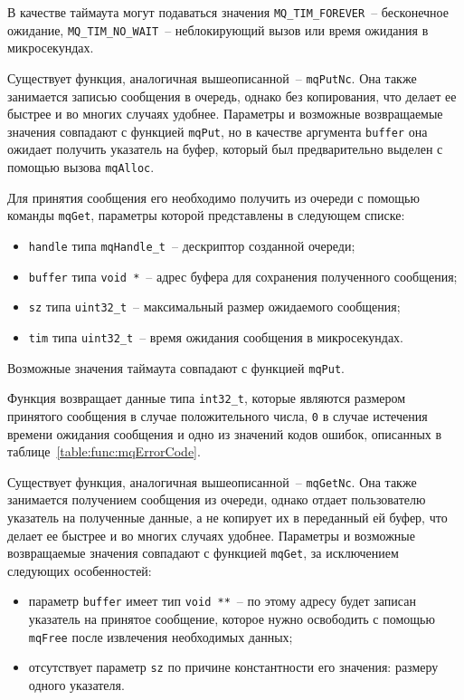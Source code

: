 В качестве таймаута могут подаваться значения \lstinline{MQ_TIM_FOREVER}~-- бесконечное ожидание, \lstinline{MQ_TIM_NO_WAIT}~-- неблокирующий вызов или
время ожидания в микросекундах.

Существует функция, аналогичная вышеописанной~-- \lstinline{mqPutNc}. Она также занимается записью сообщения в очередь, однако без копирования, что делает ее быстрее и во многих
случаях удобнее. Параметры и возможные возвращаемые значения совпадают с функцией \lstinline{mqPut},
но в качестве аргумента \lstinline{buffer} она ожидает получить указатель на
буфер, который был предварительно выделен с помощью вызова \lstinline{mqAlloc}.

Для принятия сообщения его необходимо получить из очереди с помощью команды \lstinline{mqGet}, параметры которой представлены в следующем списке:

\begin{itemize}
    \item \lstinline{handle} типа \lstinline{mqHandle_t}~-- дескриптор созданной очереди;
    \item \lstinline{buffer} типа \lstinline{void *}~-- адрес буфера для сохранения полученного сообщения;
    \item \lstinline{sz} типа \lstinline{uint32_t}~-- максимальный размер ожидаемого сообщения;
    \item \lstinline{tim} типа \lstinline{uint32_t}~-- время ожидания сообщения в микросекундах.
\end{itemize}

Возможные значения таймаута совпадают с функцией \lstinline{mqPut}.

Функция возвращает данные типа \lstinline{int32_t}, которые являются размером
принятого сообщения в случае положительного числа, \lstinline{0} в случае
истечения времени ожидания сообщения и одно из значений кодов ошибок,
описанных в таблице~\ref{table:func:mqErrorCode}.

Существует функция, аналогичная вышеописанной~-- \lstinline{mqGetNc}. Она также занимается получением сообщения из очереди, однако отдает пользователю
указатель на полученные данные, а не копирует их в переданный ей буфер, что делает ее быстрее и во многих
случаях удобнее. Параметры и возможные возвращаемые значения совпадают с функцией \lstinline{mqGet}, за исключением следующих особенностей:

\begin{itemize}
    \item параметр \lstinline{buffer} имеет тип \lstinline{void **}~-- по этому адресу
    будет записан указатель на принятое сообщение, которое нужно освободить с помощью \lstinline{mqFree} после извлечения необходимых данных;
    \item отсутствует параметр \lstinline{sz} по причине константности его значения: размеру одного указателя.
\end{itemize}

